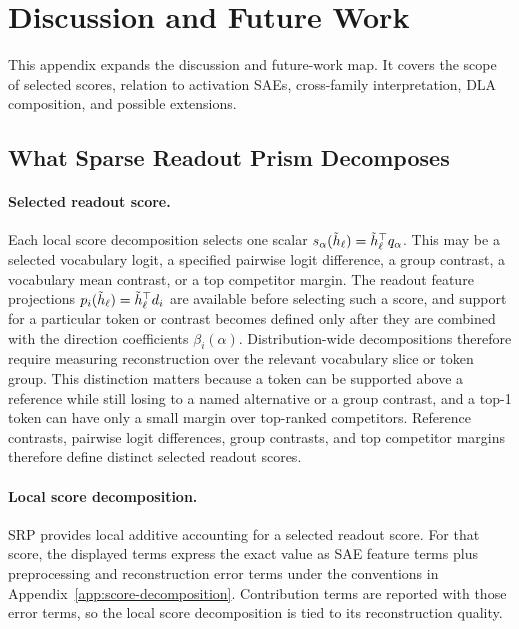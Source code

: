 \section{Discussion and Future Work}
\label{app:extended-discussion-limitations}

This appendix expands the discussion and future-work map. It covers
the scope of selected scores, relation to activation SAEs, cross-family interpretation,
DLA composition, and possible extensions.

\subsection{What Sparse Readout Prism Decomposes}
\label{app:extended-discussion-score-scope}

\paragraph{Selected readout score.}
Each local score decomposition selects one scalar
\(s_\alpha(\tilde h_\ell)=\tilde h_\ell^\top q_\alpha\). This may be a selected vocabulary logit, a specified
pairwise logit difference, a group contrast, a vocabulary mean contrast, or a
top competitor margin. The readout feature projections
\(p_i(\tilde h_\ell)=\tilde h_\ell^\top d_i\) are available before selecting such a score, and support for a
particular token or contrast becomes defined only after they are combined
with the direction coefficients \(\beta_i(\alpha)\). Distribution-wide decompositions
therefore require measuring reconstruction over the relevant vocabulary slice or
token group. This distinction matters because a token can be supported above a
reference while still losing to a named alternative or a group contrast, and a
top-1 token can have only a small margin over top-ranked competitors. Reference
contrasts, pairwise logit differences, group contrasts, and top competitor
margins therefore define distinct selected readout scores.

\paragraph{Local score decomposition.}
SRP provides local additive accounting for a selected readout score. For that
score, the displayed terms express the exact value as SAE feature terms plus
preprocessing and reconstruction error terms under the conventions in
Appendix~\ref{app:score-decomposition}. Contribution terms are reported with
those error terms, so the local score decomposition is tied to its reconstruction
quality.


